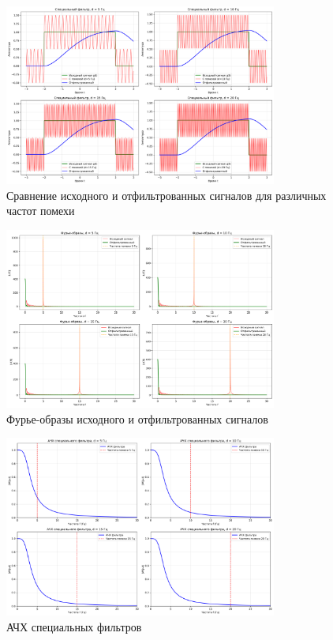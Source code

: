 \begin{figure}[H]
    \centering
    \includegraphics[width=0.8\textwidth]{images/task2/special_filter_time_domain.png}
    \caption{Сравнение исходного и отфильтрованных сигналов для различных частот помехи}
    \label{fig:special_filter_time}
\end{figure}

\begin{figure}[H]
    \centering
    \includegraphics[width=0.8\textwidth]{images/task2/special_filter_freq_domain.png}
    \caption{Фурье-образы исходного и отфильтрованных сигналов}
    \label{fig:special_filter_freq}
\end{figure}

\begin{figure}[H]
    \centering
    \includegraphics[width=0.8\textwidth]{images/task2/special_filter_frequency_response.png}
    \caption{АЧХ специальных фильтров }
    \label{fig:special_filter_freq_response}
\end{figure}

